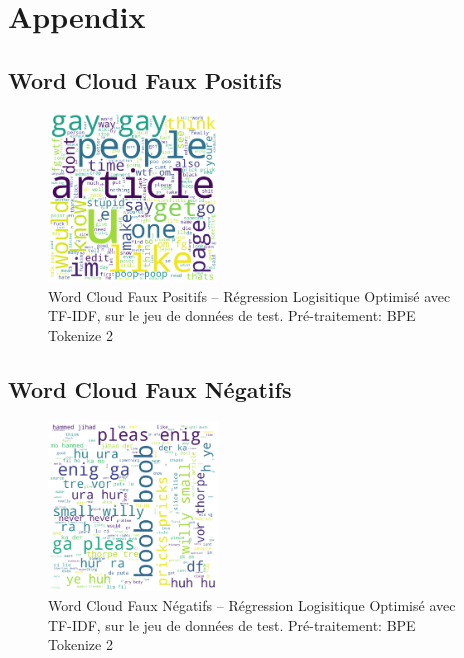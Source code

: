 \chapter{Appendix}
\label{chap:appendix_reg}

\section{Word Cloud Faux Positifs}
\begin{figure}[h]
    \centering
    \includegraphics[width=0.4\textwidth]{figures/word-cloud-reg-tf-fp.png}
    \caption{Word Cloud Faux Positifs – Régression Logisitique Optimisé avec TF-IDF, sur le jeu de données de test. Pré-traitement: BPE Tokenize 2}
\end{figure}


\section{Word Cloud Faux Négatifs}
\begin{figure}[h]
    \centering
    \includegraphics[width=0.4\textwidth]{figures/word-cloud-reg-tf-fn.png}
    \caption{Word Cloud Faux Négatifs – Régression Logisitique Optimisé avec TF-IDF, sur le jeu de données de test. Pré-traitement: BPE Tokenize 2}
\end{figure}



